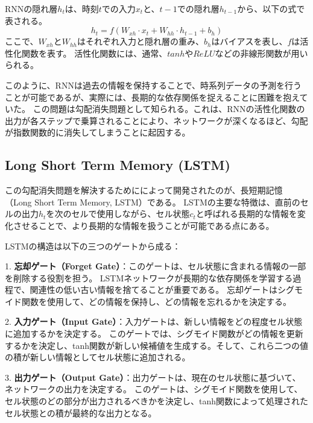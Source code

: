     RNNの隠れ層\( h_t \)は、時刻\( t \)での入力\( x_t \)と、\( t-1 \)での隠れ層\( h_{t-1} \)から、以下の式で表される。
    \begin{equation}
      h_t = f(W_{xh} \cdot x_t + W_{hh} \cdot h_{t-1} + b_h)
    \end{equation}
    ここで、\( W_{xh} \)と\( W_{hh} \)はそれぞれ入力と隠れ層の重み、\( b_h \)はバイアスを表し、\( f \)は活性化関数を表す。
    活性化関数には、通常、\( tanh \)や\( ReLU \)などの非線形関数が用いられる。

    このように、RNNは過去の情報を保持することで、時系列データの予測を行うことが可能であるが、実際には、長期的な依存関係を捉えることに困難を抱えていた。
    この問題は勾配消失問題として知られる。これは、RNNの活性化関数の出力が各ステップで乗算されることにより、ネットワークが深くなるほど、勾配が指数関数的に消失してしまうことに起因する。
    
    \subsection{Long Short Term Memory (LSTM)}
    この勾配消失問題を解決するためにによって開発されたのが、長短期記憶（Long Short Term Memory, LSTM）である。
    LSTMの主要な特徴は、直前のセルの出力\( h_t \)を次のセルで使用しながら、セル状態\( c_t \)と呼ばれる長期的な情報を変化させることで、より長期的な情報を扱うことが可能である点にある。

    LSTMの構造は以下の三つのゲートから成る：
    
    1. \textbf{忘却ゲート（Forget Gate）}：このゲートは、セル状態に含まれる情報の一部を削除する役割を担う。
    LSTMネットワークが長期的な依存関係を学習する過程で、関連性の低い古い情報を捨てることが重要である。
    忘却ゲートはシグモイド関数を使用して、どの情報を保持し、どの情報を忘れるかを決定する。
   
    2. \textbf{入力ゲート（Input Gate）}：入力ゲートは、新しい情報をどの程度セル状態に追加するかを決定する。
    このゲートでは、シグモイド関数がどの情報を更新するかを決定し、tanh関数が新しい候補値を生成する。そして、これら二つの値の積が新しい情報としてセル状態に追加される。
    
    3. \textbf{出力ゲート（Output Gate）}：出力ゲートは、現在のセル状態に基づいて、ネットワークの出力を決定する。
    このゲートは、シグモイド関数を使用して、セル状態のどの部分が出力されるべきかを決定し、tanh関数によって処理されたセル状態との積が最終的な出力となる。
    
